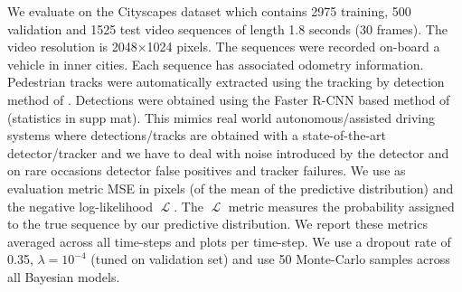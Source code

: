 We evaluate on the Cityscapes dataset \cite{Cordts2016Cityscapes} which contains 2975 training, 500 validation and 1525 test video sequences of length 1.8 seconds (30 frames). The video resolution is 2048$\times$1024 pixels. The sequences were recorded on-board a vehicle in inner cities. Each sequence has associated odometry information. Pedestrian tracks were automatically extracted using the tracking by detection method of \cite{siyu}. Detections were obtained using the Faster R-CNN based method of \cite{zhang2017citypersons} (statistics in supp mat). This mimics real world autonomous/assisted driving systems where detections/tracks are obtained with a state-of-the-art detector/tracker and we have to deal with noise introduced by the detector and on rare occasions detector false positives and tracker failures. We use as evaluation metric MSE in pixels (of the mean of the predictive distribution) and the negative log-likelihood $\operatorname{\mathcal{L}}$. The $\operatorname{\mathcal{L}}$ metric measures the probability assigned to the true sequence by our predictive distribution. We report these metrics averaged across all time-steps and plots per time-step. We use a dropout rate of 0.35, $\lambda = 10^{-4}$ (tuned on validation set) and use 50 Monte-Carlo samples across all Bayesian models. 

